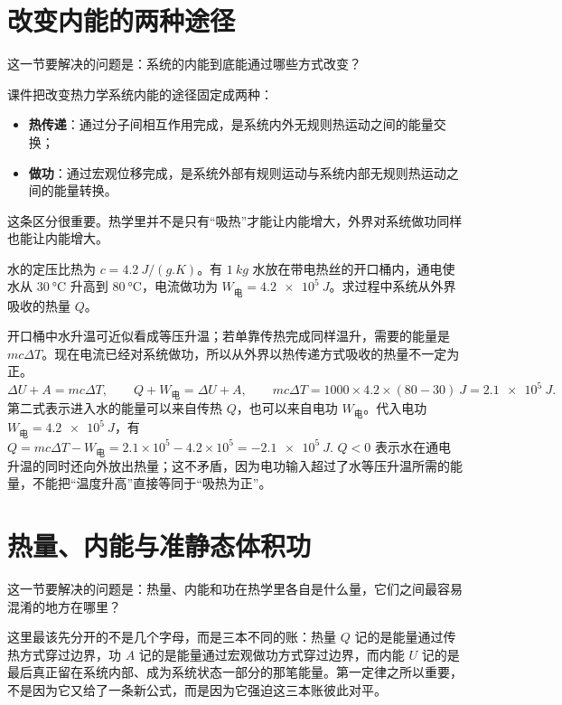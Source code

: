 \documentclass[lang=cn,11pt]{elegantbook}
\newcommand{\bridge}[1]{\begin{note}#1\end{note}}
\begin{document}
\section{改变内能的两种途径}

这一节要解决的问题是：系统的内能到底能通过哪些方式改变？

课件把改变热力学系统内能的途径固定成两种：
\begin{itemize}
 \item \textbf{热传递}：通过分子间相互作用完成，是系统内外无规则热运动之间的能量交换；
 \item \textbf{做功}：通过宏观位移完成，是系统外部有规则运动与系统内部无规则热运动之间的能量转换。
\end{itemize}

这条区分很重要。热学里并不是只有“吸热”才能让内能增大，外界对系统做功同样也能让内能增大。

\begin{exercise}[电热丝加热开口水桶时怎样给 \(Q\) 判号]
水的定压比热为 \(c=\SI{4.2}{J/(g.K)}\)。有 \(\SI{1}{kg}\) 水放在带电热丝的开口桶内，通电使水从 \(\SI{30}{\celsius}\) 升高到 \(\SI{80}{\celsius}\)，电流做功为 \(W_{\text{电}}=\SI{4.2e5}{J}\)。求过程中系统从外界吸收的热量 \(Q\)。
\end{exercise}

\begin{solution}
开口桶中水升温可近似看成等压升温；若单靠传热完成同样温升，需要的能量是 \(mc\Delta T\)。现在电流已经对系统做功，所以从外界以热传递方式吸收的热量不一定为正。
 \(\Delta U+A=mc\Delta T,\qquad Q+W_{\text{电}}=\Delta U+A,\qquad mc\Delta T =1000\times 4.2\times(80-30)\ \si{J} =\SI{2.1e5}{J}.\) 
第二式表示进入水的能量可以来自传热 \(Q\)，也可以来自电功 \(W_{\text{电}}\)。代入电功 \(W_{\text{电}}=\SI{4.2e5}{J}\)，有
 \(Q=mc\Delta T-W_{\text{电}} =2.1\times10^5-4.2\times10^5 =-\SI{2.1e5}{J}.\) 
\(Q<0\) 表示水在通电升温的同时还向外放出热量；这不矛盾，因为电功输入超过了水等压升温所需的能量，不能把“温度升高”直接等同于“吸热为正”。
\end{solution}

\section{热量、内能与准静态体积功}

这一节要解决的问题是：热量、内能和功在热学里各自是什么量，它们之间最容易混淆的地方在哪里？

\bridge{这里最该先分开的不是几个字母，而是三本不同的账：热量 \(Q\) 记的是能量通过传热方式穿过边界，功 \(A\) 记的是能量通过宏观做功方式穿过边界，而内能 \(U\) 记的是最后真正留在系统内部、成为系统状态一部分的那笔能量。第一定律之所以重要，不是因为它又给了一条新公式，而是因为它强迫这三本账彼此对平。}
\end{document}

